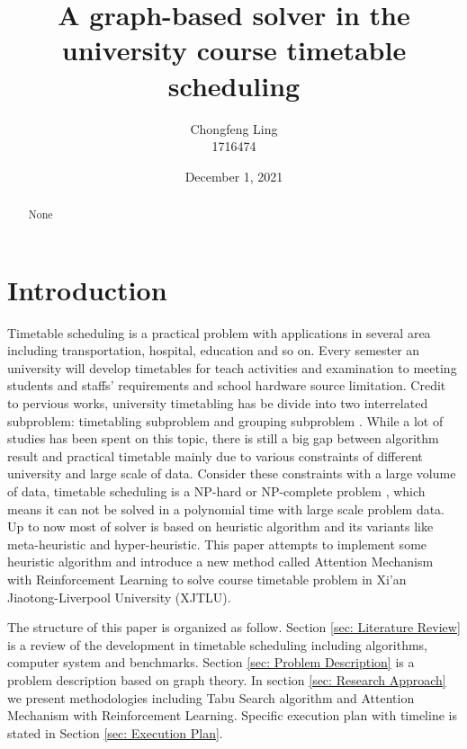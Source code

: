 \documentclass{article}
\title{A graph-based solver in the university course timetable scheduling\text}
\author{Chongfeng Ling\\1716474}
\date{December 1, 2021}
\begin{document}
\maketitle

\begin{abstract}
	\begin{center}
		None
	\end{center}
\end{abstract}


\newpage
\tableofcontents
\newpage
\section{Introduction}

Timetable scheduling is a practical problem with applications in several area including transportation, hospital, education and so on. Every semester an university will develop timetables for teach activities and examination to meeting students and staffs' requirements and school hardware source limitation. Credit to pervious works, university timetabling has be divide into two interrelated subproblem: timetabling subproblem and grouping subproblem \citep{(werra1989)tabu}. While a lot of studies has been spent on this topic, there is still a big gap between algorithm result and practical timetable \citep{(mccollum2006)perspective} mainly due to various constraints of different university and large scale of data. Consider these constraints with a large volume of data, timetable scheduling is a NP-hard or NP-complete problem \citep{(even1975)complexity}, which means it can not be solved in a polynomial time with large scale problem data. Up to now most of solver is based on heuristic algorithm and its variants like meta-heuristic and hyper-heuristic. This paper attempts to implement some heuristic algorithm and introduce a new method called Attention Mechanism with Reinforcement Learning to solve course timetable problem in Xi'an Jiaotong-Liverpool University (XJTLU).

The structure of this paper is organized as follow. Section \ref{sec: Literature Review} is a review of the development in timetable scheduling including algorithms, computer system and benchmarks. Section \ref{sec: Problem Description} is a problem description based on graph theory. In section \ref{sec: Research Approach} we present methodologies  including Tabu Search algorithm and Attention Mechanism with Reinforcement Learning. Specific execution plan with timeline is stated in Section \ref{sec: Execution Plan}.
\end{document}
